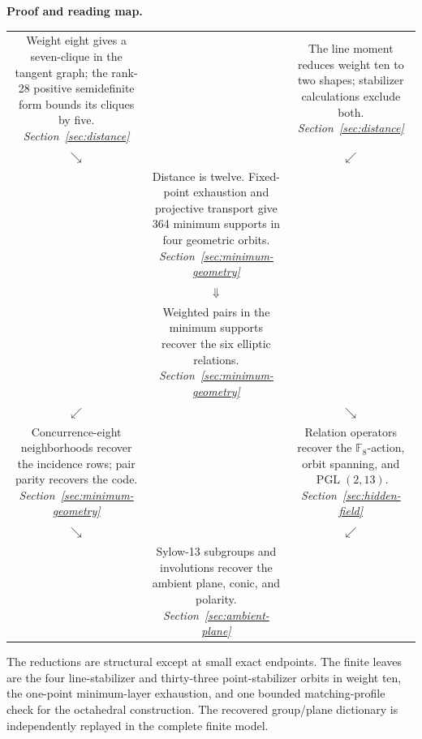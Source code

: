 \documentclass[11pt]{article}
\theoremstyle{definition}
\theoremstyle{remark}
\newcommand{\F}{\mathbb F}
\newcommand{\PGL}{\operatorname{PGL}}
\begin{document}
\medskip
\noindent\textbf{Proof and reading map.}
\begin{center}
\footnotesize
\setlength{\tabcolsep}{3pt}
\renewcommand{\arraystretch}{0.9}
\begin{tabular}{@{}c c c@{}}
\fbox{\parbox{0.27\textwidth}{\centering
Weight eight gives a seven-clique in the tangent graph; the rank-28
positive semidefinite form bounds its cliques by five.\\[-1pt]
\emph{Section~\ref{sec:distance}}}}
&&
\fbox{\parbox{0.27\textwidth}{\centering
The line moment reduces weight ten to two shapes; stabilizer calculations
exclude both.\\[-1pt]
\emph{Section~\ref{sec:distance}}}}
\\
\(\searrow\) && \(\swarrow\)\\
&
\fbox{\parbox{0.35\textwidth}{\centering
Distance is twelve.  Fixed-point exhaustion and projective transport give
364 minimum supports in four geometric orbits.\\[-1pt]
\emph{Section~\ref{sec:minimum-geometry}}}}
&\\
& \(\Downarrow\) &\\
&
\fbox{\parbox{0.35\textwidth}{\centering
Weighted pairs in the minimum supports recover the six elliptic relations.\\[-1pt]
\emph{Section~\ref{sec:minimum-geometry}}}}
&\\
\(\swarrow\) && \(\searrow\)\\
\fbox{\parbox{0.27\textwidth}{\centering
Concurrence-eight neighborhoods recover the incidence rows; pair parity
recovers the code.\\[-1pt]
\emph{Section~\ref{sec:minimum-geometry}}}}
&&
\fbox{\parbox{0.27\textwidth}{\centering
Relation operators recover the \(\F_8\)-action, orbit spanning, and
\(\PGL(2,13)\).\\[-1pt]
\emph{Section~\ref{sec:hidden-field}}}}
\\
\(\searrow\) && \(\swarrow\)\\
&
\fbox{\parbox{0.35\textwidth}{\centering
Sylow-13 subgroups and involutions recover the ambient plane, conic, and
polarity.\\[-1pt]
\emph{Section~\ref{sec:ambient-plane}}}}
&
\end{tabular}
\end{center}

The reductions are structural except at small exact endpoints.  The finite
leaves are the four line-stabilizer and thirty-three point-stabilizer orbits
in weight ten, the one-point minimum-layer exhaustion, and one bounded
matching-profile check for the octahedral construction.  The recovered
group/plane dictionary is independently replayed in the complete finite
model.
\end{document}
